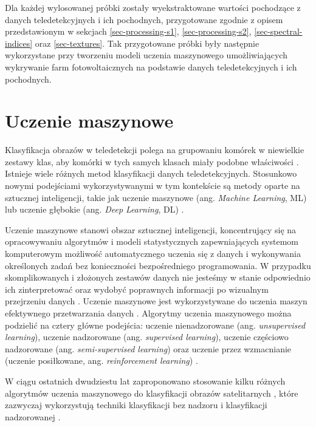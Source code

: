 \documentclass{amuthesis}
\begin{document}
Dla każdej wylosowanej próbki zostały wyekstraktowane wartości
pochodzące z danych teledetekcyjnych i ich pochodnych, przygotowane
zgodnie z opisem przedstawionym w sekcjach \ref{sec-processing-s1},
\ref{sec-processing-s2}, \ref{sec-spectral-indices} oraz
\ref{sec-textures}. Tak przygotowane próbki były następnie wykorzystane
przy tworzeniu modeli uczenia maszynowego umożliwiających wykrywanie
farm fotowoltaicznych na podstawie danych teledetekcyjnych i ich
pochodnych.

\hypertarget{sec-machine-learning}{%
\section{Uczenie maszynowe}\label{sec-machine-learning}}

Klasyfikacja obrazów w teledetekcji polega na grupowaniu komórek w
niewielkie zestawy klas, aby komórki w tych samych klasach miały podobne
właściwości \autocite{ismail_2009_classification}. Istnieje wiele
różnych metod klasyfikacji danych teledetekcyjnych. Stosunkowo nowymi
podejściami wykorzystywanymi w tym kontekście są metody oparte na
sztucznej inteligencji, takie jak uczenie maszynowe (ang. \emph{Machine
Learning}, ML) lub uczenie głębokie (ang. \emph{Deep Learning}, DL)
\autocite{hejmanowska_2020_dane}.

Uczenie maszynowe stanowi obszar sztucznej inteligencji, koncentrujący
się na opracowywaniu algorytmów i modeli statystycznych zapewniających
systemom komputerowym możliwość automatycznego uczenia się z danych i
wykonywania określonych zadań bez konieczności bezpośredniego
programowania. W przypadku skomplikowanych i złożonych zestawów danych
nie jesteśmy w stanie odpowiednio ich zinterpretować oraz wydobyć
poprawnych informacji po wizualnym przejrzeniu danych
\autocite{mahesh_2019_ml}. Uczenie maszynowe jest wykorzystywane do
uczenia maszyn efektywnego przetwarzania danych
\autocite{sindayigaya_2022_ml}. Algorytmy uczenia maszynowego można
podzielić na cztery główne podejścia: uczenie nienadzorowane (ang.
\emph{unsupervised learning}), uczenie nadzorowane (ang.
\emph{supervised learning}), uczenie częściowo nadzorowane (ang.
\emph{semi-supervised learning}) oraz uczenie przez wzmacnianie (uczenie
posiłkowane, ang. \emph{reinforcement learning})
\autocite{sarker_2021_ml}.

W ciągu ostatnich dwudziestu lat zaproponowano stosowanie kilku różnych
algorytmów uczenia maszynowego do klasyfikacji obrazów satelitarnych
\autocite{sheykhmousa_2020_svm_vs_rf}, które zazwyczaj wykorzystują
techniki klasyfikacji bez nadzoru i klasyfikacji nadzorowanej
\autocite{ismail_2009_classification}.
\end{document}
